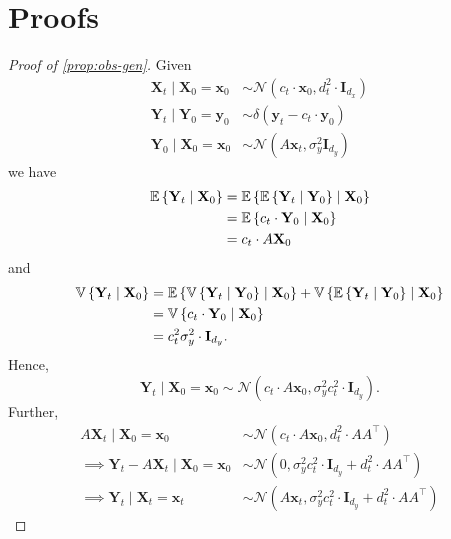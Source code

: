 \newpage

\section{Proofs}\label{sec:proofs}

\begin{proof}[Proof of \autoref{prop:obs-gen}] \label{prf:obs-generation}
    Given
    \begin{align*}
        \mathbf{X}_t \mid \mathbf{X}_0 = \mathbf{x}_0 &\sim \mathcal{N}(c_t\cdot\mathbf{x}_0, d_t^2\cdot\mathbf{I}_{d_x}) \\
        \mathbf{Y}_t \mid \mathbf{Y}_0 = \mathbf{y}_0 &\sim \delta(\mathbf{y}_t - c_t\cdot \mathbf{y}_0) \\
        \mathbf{Y}_0 \mid \mathbf{X}_0 = \mathbf{x}_0 &\sim \mathcal{N}(A\mathbf{x}_t, \sigma_y^2\mathbf{I}_{d_y})
    \end{align*}
    we have
    \begin{align*}
        \mathbb{E} \left\{ \mathbf{Y}_t \mid \mathbf{X}_0 \right\} &= \mathbb{E} \left\{ \mathbb{E} \left\{ \mathbf{Y}_t \mid \mathbf{Y}_0 \right\} \mid \mathbf{X}_0 \right\} \\
        &= \mathbb{E} \left\{ c_t\cdot \mathbf{Y}_0 \mid \mathbf{X}_0 \right\} \\
        &= c_t\cdot A\mathbf{X}_0
    \end{align*}
    and
    \begin{align*}
        \mathbb{V} \left\{ \mathbf{Y}_t \mid \mathbf{X}_0 \right\} &= \mathbb{E} \left\{ \mathbb{V} \left\{ \mathbf{Y}_t \mid \mathbf{Y}_0 \right\} \mid \mathbf{X}_0 \right\} + \mathbb{V} \left\{ \mathbb{E} \left\{ \mathbf{Y}_t \mid \mathbf{Y}_0 \right\} \mid \mathbf{X}_0 \right\} \\
        &= \mathbb{V} \left\{ c_t\cdot \mathbf{Y}_0 \mid \mathbf{X}_0 \right\} \\
        &= c_t^2\sigma_y^2\cdot \mathbf{I}_{d_y}.
    \end{align*}
    Hence,
    \begin{equation*}
        \mathbf{Y}_t \mid \mathbf{X}_0 = \mathbf{x}_0 \sim \mathcal{N}(c_t\cdot A\mathbf{x}_0, \sigma_y^2c_t^2\cdot \mathbf{I}_{d_y}).
    \end{equation*}
    Further,
    \begin{align*}
        A\mathbf{X}_t \mid \mathbf{X}_0 = \mathbf{x}_0 &\sim \mathcal{N}(c_t\cdot A\mathbf{x}_0, d_t^2\cdot AA^\top) \\
        \implies \mathbf{Y}_t - A\mathbf{X}_t \mid \mathbf{X}_0 = \mathbf{x}_0 &\sim \mathcal{N}(0, \sigma_y^2c_t^2\cdot \mathbf{I}_{d_y} + d_t^2\cdot AA^\top) \\
        \implies \mathbf{Y}_t \mid \mathbf{X}_t = \mathbf{x}_t &\sim \mathcal{N}(A\mathbf{x}_t, \sigma_y^2c_t^2\cdot \mathbf{I}_{d_y} + d_t^2\cdot AA^\top)
    \end{align*}

\end{proof}

